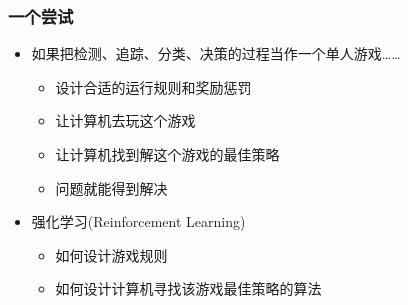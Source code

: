 \documentclass[10pt,CJK]{beamer}
\begin{document}
	\begin{frame}
		\frametitle{一个尝试}
		\begin{itemize}
			\item 如果把检测、追踪、分类、决策的过程当作一个单人游戏……
			\pause
			\begin{itemize}
				\item 设计合适的运行规则和奖励惩罚
				\pause
				\item 让计算机去玩这个游戏
				\pause
				\item 让计算机找到解这个游戏的最佳策略
				\pause
				\item 问题就能得到解决
			\end{itemize}
			\pause
			\item 强化学习(Reinforcement Learning)
			\pause
			\begin{itemize}
				\item 如何设计游戏规则\pause
				\item 如何设计计算机寻找该游戏最佳策略的算法
			\end{itemize}
		\end{itemize}
	\end{frame}
	
\end{document}
